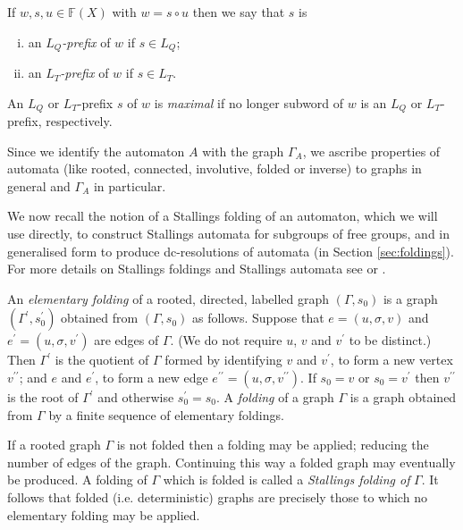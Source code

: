 \documentclass[a4paper,12pt]{article}
\newcommand{\G}{\Gamma }
\newcommand{\s}{\sigma }
\numberwithin{equation}{section}
\numberwithin{figure}{section}
\newcommand{\FF}{\ensuremath{\mathbb{F}}}
\newcommand{\be}{\begin{enumerate}}
\newcommand{\ee}{\end{enumerate}}
\begin{document}
If $w, s, u\in \FF(X)$ with $w=s\circ u$ then we say that $s$ is
\be[(i)]
\item
 an $L_Q${\em -prefix} of $w$ if $s\in L_Q$;
\item
an %
$L_T${\em -prefix} of $w$ if $s\in L_T$.
\ee
An $L_Q$ or $L_T$-prefix $s$ of $w$ is  {\em maximal} if no longer
subword of $w$ is an $L_Q$ or $L_T$-prefix, respectively.

Since we identify the automaton $A$ with the graph $\G_A$, we
ascribe properties of automata (like rooted, connected,
involutive, folded or inverse) to graphs in general and $\G_A$ in
particular.

We now recall the notion of a Stallings folding of an automaton,
which we will use directly, to construct Stallings automata for
subgroups of free groups, and in generalised form to produce
dc-resolutions of automata (in Section \ref{sec:foldings}). For
more details on Stallings foldings  and  Stallings automata  see
\cite{ventura11} or \cite{BartholdiSilva}.

An {\em elementary folding} of a rooted, directed, labelled
graph $(\G,s_0)$ is a
graph $(\G^\prime,s^\prime_0)$ obtained from $(\G,s_0)$ as
follows. Suppose that $e=(u, \s, v)$ and $e^\prime=(u, \s,
v^\prime)$ are edges of $\G$. (We do not require $u$, $v$ and
$v^\prime$ to be distinct.)
 Then $\G^\prime$ is the quotient of $\G$ formed by identifying
$v$ and $v^\prime$, to form a new vertex $v^{\prime\prime}$; and
$e$ and $e^\prime$, to form a new edge $e^{\prime\prime}=(u, \s,
v^{\prime\prime})$. If $s_0= v$ or $s_0 = v^\prime$ then
$v^{\prime\prime}$ is the root of $\G^\prime$ and otherwise
$s^\prime_0=s_0$.
 A {\em folding} of a graph $\G$ is a graph obtained
from $\G$ by a finite sequence of elementary foldings.

If a rooted graph $\G$ is not folded then a folding may be applied; reducing the
number of edges of the graph. Continuing this way a folded graph may eventually
be produced.
A folding of $\G$ which is folded is called a \emph{Stallings folding of}
$\G$.
It follows that  folded (i.e. deterministic) graphs are precisely those
to which no elementary folding may be applied.
\end{document}

